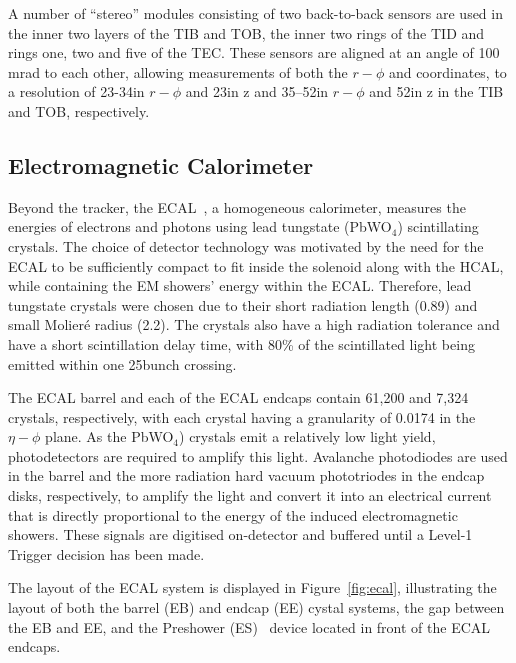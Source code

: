 A number of ``stereo'' modules consisting of two back-to-back sensors are used in the inner two layers of the TIB and TOB, the inner two rings of the TID and rings one, two and five of the TEC.
These sensors are aligned at an angle of 100 mrad to each other, allowing measurements of both the $r-\phi$ and \rz coordinates, to a resolution of 23-34\mum in $r-\phi$ and 23\mum in z and 35–52\mum in $r-\phi$ and 52\mum in z in the TIB and TOB, respectively.

\subsection{Electromagnetic Calorimeter}\label{subsec:ECAL}
Beyond the tracker, the ECAL~\cite{CMS:1997ysd,CMS:2002xia}, a homogeneous calorimeter, measures the energies of electrons and photons using lead tungstate (PbWO$_{4}$) scintillating crystals.
The choice of detector technology was motivated by the need for the ECAL to be sufficiently compact to fit inside the solenoid along with the HCAL, while containing the EM showers' energy within the ECAL.
Therefore, lead tungstate crystals were chosen due to their short radiation length (0.89\cm) and small Molier\'{e} radius (2.2\cm).
The crystals also have a high radiation tolerance and have a short scintillation delay time, with 80\% of the scintillated light being emitted within one 25\ns bunch crossing.

The ECAL barrel and each of the ECAL endcaps contain 61,200 and 7,324 crystals, respectively, with each crystal having a granularity of 0.0174 in the $\eta - \phi$ plane.
As the PbWO$_{4}$) crystals emit a relatively low light yield, photodetectors are required to amplify this light.
Avalanche photodiodes are used in the barrel and the more radiation hard vacuum phototriodes in the endcap disks, respectively, to amplify the light and convert it into an electrical current that is directly proportional to the energy of the induced electromagnetic showers.
These signals are digitised on-detector and buffered until a Level-1 Trigger decision has been made.

The layout of the ECAL system is displayed in Figure~\ref{fig:ecal}, illustrating the layout of both the barrel (EB) and endcap (EE) cystal systems, the gap between the EB and EE, and the Preshower (ES)~\cite{Loos:539819} device located in front of the ECAL endcaps.

